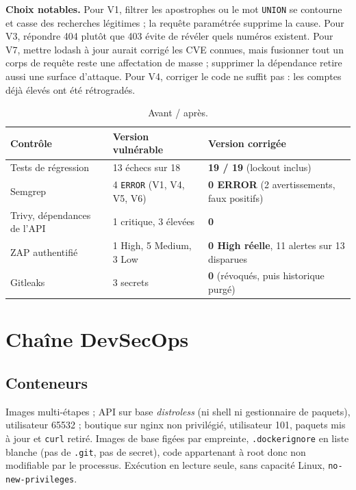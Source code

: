 \documentclass[11pt,a4paper]{article}
\newcommand{\code}[1]{\texttt{\small #1}}
\begin{document}
\textbf{Choix notables.} Pour V1, filtrer les apostrophes ou le mot \code{UNION} se contourne et casse des
recherches légitimes ; la requête paramétrée supprime la cause. Pour V3, répondre 404 plutôt que 403 évite
de révéler quels numéros existent. Pour V7, mettre lodash à jour aurait corrigé les CVE connues, mais
fusionner tout un corps de requête reste une affectation de masse ; supprimer la dépendance retire aussi
une surface d'attaque. Pour V4, corriger le code ne suffit pas : les comptes déjà élevés ont été
rétrogradés.

\begin{table}[H]
\small
\begin{tabularx}{\linewidth}{@{}YYY@{}}
\toprule
\textbf{Contrôle} & \textbf{Version vulnérable} & \textbf{Version corrigée} \\
\midrule
Tests de régression & 13 échecs sur 18 & \textbf{19 / 19} (lockout inclus) \\
Semgrep & 4 \code{ERROR} (V1, V4, V5, V6) & \textbf{0 ERROR} (2 avertissements, faux positifs) \\
Trivy, dépendances de l'API & 1 critique, 3 élevées & \textbf{0} \\
ZAP authentifié & 1 High, 5 Medium, 3 Low & \textbf{0 High réelle}, 11 alertes sur 13 disparues \\
Gitleaks & 3 secrets & \textbf{0} (révoqués, puis historique purgé) \\
\bottomrule
\end{tabularx}
\caption{Avant / après.}
\end{table}

\section{Chaîne DevSecOps}

\subsection{Conteneurs}
Images multi-étapes ; API sur base \emph{distroless} (ni shell ni gestionnaire de paquets), utilisateur
65532 ; boutique sur nginx non privilégié, utilisateur 101, paquets mis à jour et \code{curl} retiré. Images
de base figées par empreinte, \code{.dockerignore} en liste blanche (pas de \code{.git}, pas de secret), code
appartenant à root donc non modifiable par le processus. Exécution en lecture seule, sans capacité Linux,
\code{no-new-privileges}.
\end{document}
